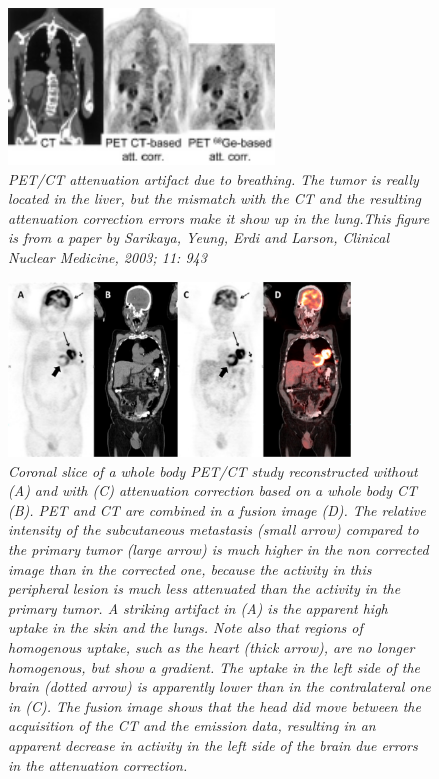 \documentclass[11pt,oneside]{book}
\begin{document}
%
\begin{figure}[tbp]
\centering
\includegraphics[width=0.63\textwidth]{figs/fig_petctbreathing.pdf}
\caption{\label{fig:petctbreathing} \emph{PET/CT attenuation artifact
due to breathing. The tumor is really located in the liver, but the
mismatch with the CT and the resulting attenuation correction errors
make it show up in the lung.This figure is from a paper by Sarikaya,
Yeung, Erdi and Larson, Clinical Nuclear Medicine, 2003; 11: 943}}
\end{figure}

\begin{figure}[tbp]
\centering
\includegraphics[width=0.81\textwidth]{figs/fig_petctatcor.pdf}
\caption{\label{fig:petctatcor} \emph{Coronal slice of a whole body
PET/CT study reconstructed without (A) and with (C) attenuation
correction based on a whole body CT (B). PET and CT are combined in a
fusion image (D). The relative intensity of the subcutaneous
metastasis (small arrow) compared to the primary tumor (large arrow)
is much higher in the non corrected image than in the corrected one,
because the activity in this peripheral lesion is much less attenuated
than the activity in the primary tumor. A striking artifact in (A) is
the apparent high uptake in the skin and the lungs. Note also that
regions of homogenous uptake, such as the heart (thick arrow), are no
longer homogenous, but show a gradient. The uptake in the left side of
the brain (dotted arrow) is apparently lower than in the contralateral
one in (C). The fusion image shows that the head did move between the
acquisition of the CT and the emission data, resulting in an apparent
decrease in activity in the left side of the brain due errors in the
attenuation correction.}}
\end{figure}
\end{document}
